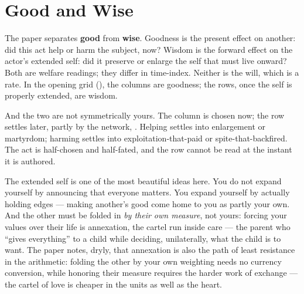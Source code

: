 \documentclass[../main_explainer]{subfiles}
\begin{document}

\section{Good and Wise}
\label{sec:explainer:good-wise}

The paper separates \textbf{good} from \textbf{wise}. Goodness is the present effect on
another: did this act help or harm the subject, now? Wisdom is the forward effect on the
actor's extended self: did it preserve or enlarge the self that must live onward? Both
are welfare readings; they differ in time-index. Neither is the will, which is a rate.
In the opening grid (), the columns are goodness; the rows, once the self
is properly extended, are wisdom.

And the two are not symmetrically yours. The column is chosen now; the row settles
later, partly by the network, . Helping settles into enlargement or martyrdom; harming settles into
exploitation-that-paid or spite-that-backfired. The act is half-chosen and half-fated,
and the row cannot be read at the instant it is authored.


The extended self is one of the most beautiful ideas here. You do not expand yourself by
announcing that everyone matters. You expand yourself by actually holding edges ---
making another's good come home to you as partly your own. And the other must be folded
in \emph{by their own measure}, not yours: forcing your values over their life is
annexation, the cartel run inside care --- the parent who ``gives everything'' to a
child while deciding, unilaterally, what the child is to want. The paper notes, dryly,
that annexation is also the path of least resistance in the arithmetic: folding the
other by your own weighting needs no currency conversion, while honoring their measure
requires the harder work of exchange --- the cartel of love is cheaper in the units as
well as the heart.
\end{document}
